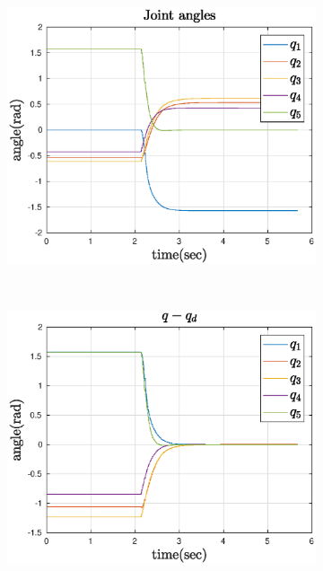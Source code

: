 \begin{figure}[htbp]
    \centering
    \begin{subfigure}[htbp]{0.45\textwidth}
        \centering
        \includegraphics[width = \picsSiz\linewidth]{img/LSq.eps}
        \caption{ }
        \label{fig:LSq}
    \end{subfigure}
    ~ 
    \begin{subfigure}[htbp]{0.45\textwidth}
        \centering
        \includegraphics[width = \picsSiz\linewidth]{img/LSerror.eps}
        \caption{ }
    \end{subfigure}

\end{figure}
